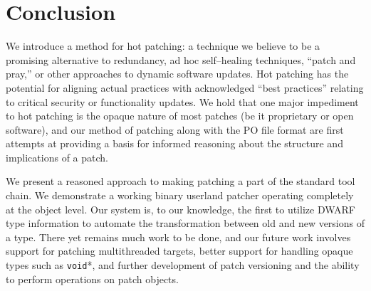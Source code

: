 \section{Conclusion}
\label{sec:conclusion}

We introduce a method for hot patching: a technique we believe to be a
promising alternative to redundancy, ad hoc self--healing techniques,
``patch and pray,'' or other approaches to dynamic software updates.
Hot patching has the potential for aligning actual practices with
acknowledged ``best practices'' relating to critical security or 
functionality updates.  We hold that one major impediment to hot
patching is the opaque nature of most patches (be it
proprietary or open software), and our method of patching along with the
PO file format are first attempts at providing a basis for informed reasoning
about the structure and implications of a patch. 

We present a reasoned approach to making patching a part of the
standard tool chain. We demonstrate a working binary userland patcher
operating completely at the object level. Our system is, to our
knowledge, the first to utilize DWARF type information to automate the
transformation between old and new versions of a type. There yet
remains much work to be done, and our future work involves support for
patching multithreaded targets, better support for handling opaque
types such as \texttt{void}*, and further development of patch
versioning and the ability to perform operations on patch objects.
